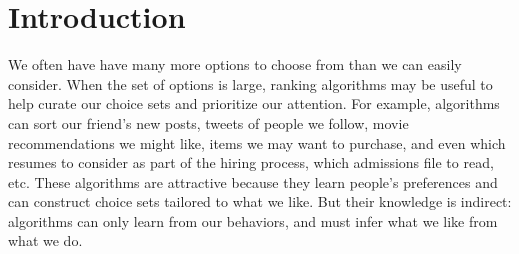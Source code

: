 \documentclass[12pt,letterpaper]{article}
\begin{document}
\section{Introduction}
We often have have many more options to choose from than we can easily consider. When the set of options is large, ranking algorithms may be useful to help curate our choice sets and prioritize our attention. For example, algorithms can sort our friend's new posts, tweets of people we follow, movie recommendations we might like, items we may want to purchase, and even which resumes to consider as part of the hiring process, which admissions file to read, etc. These algorithms are attractive because they learn people's preferences and can construct choice sets tailored to what we like. But their knowledge is indirect: algorithms can only learn from our behaviors, and must infer what we like from what we do. 
\end{document}
